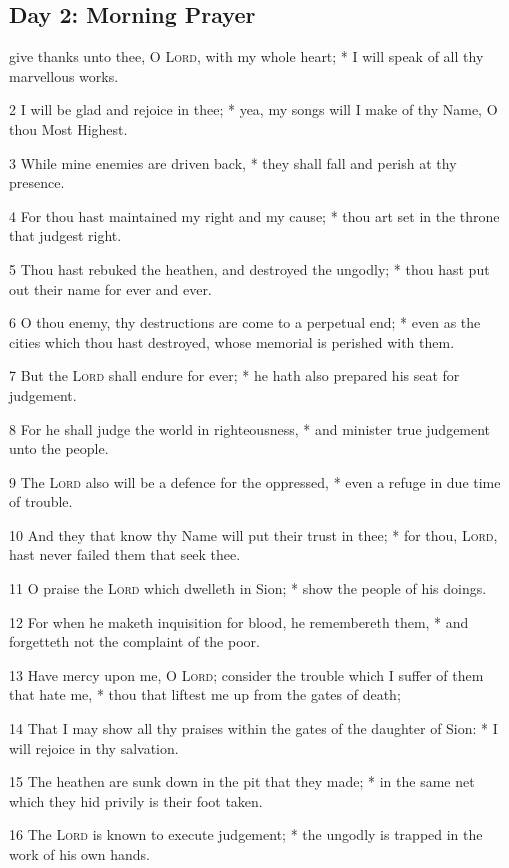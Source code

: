\subsection{Day 2: Morning Prayer}
 give thanks unto thee, O {\textsc{Lord}}, with my whole heart; * I will speak of all thy marvellous works.\par
2 I will be glad and rejoice in thee; * yea, my songs will I make of thy Name, O thou Most Highest.\par
3 While mine enemies are driven back, * they shall fall and perish at thy presence.\par
4 For thou hast maintained my right and my cause; * thou art set in the throne that judgest right.\par
5 Thou hast rebuked the heathen, and destroyed the ungodly; * thou hast put out their name for ever and ever.\par
6 O thou enemy, thy destructions are come to a perpetual end; * even as the cities which thou hast destroyed, whose memorial is perished with them.\par
7 But the {\textsc{Lord}} shall endure for ever; * he hath also prepared his seat for judgement.\par
8 For he shall judge the world in righteousness, * and minister true judgement unto the people.\par
9 The {\textsc{Lord}} also will be a defence for the oppressed, * even a refuge in due time of trouble.\par
10 And they that know thy Name will put their trust in thee; * for thou, {\textsc{Lord}}, hast never failed them that seek thee.\par
11 O praise the {\textsc{Lord}} which dwelleth in Sion; * show the people of his doings.\par
12 For when he maketh inquisition for blood, he remembereth them, * and forgetteth not the complaint of the poor.\par
13 Have mercy upon me, O {\textsc{Lord}}; consider the trouble which I suffer of them that hate me, * thou that liftest me up from the gates of death;\par
14 That I may show all thy praises within the gates of the daughter of Sion: * I will rejoice in thy salvation.\par
15 The heathen are sunk down in the pit that they made; * in the same net which they hid privily is their foot taken.\par
16 The {\textsc{Lord}} is known to execute judgement; * the ungodly is trapped in the work of his own hands.\par
